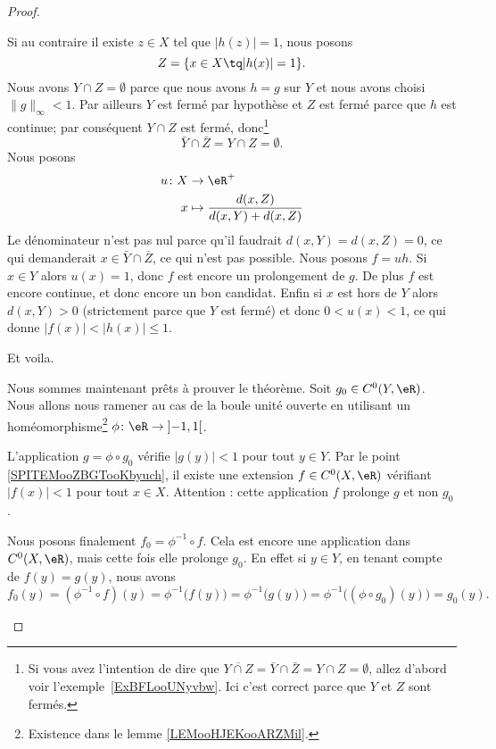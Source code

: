 \begin{proof}
\begin{subproof}
		Si au contraire il existe \( z\in X\) tel que \( | h(z)|=1 \), nous posons
		\begin{equation}		\label{EQooIVXAooZQZxlq}
			Z=\{ x\in X\tq | h(x) |=1 \}.
		\end{equation}
		Nous avons \( Y\cap Z=\emptyset\) parce que nous avons \( h=g\) sur \( Y\) et nous avons choisi \( \| g \|_{\infty}<1\). Par ailleurs \( Y\) est fermé par hypothèse et \( Z\) est fermé parce que \( h\) est continue; par conséquent \( Y\cap Z\) est fermé, donc\footnote{Si vous avez l'intention de dire que \( \overline{ Y\cap Z }=\bar Y\cap\bar Z=Y\cap Z=\emptyset\), allez d'abord voir l'exemple~\ref{ExBFLooUNyvbw}. Ici c'est correct parce que \( Y\) et \( Z\) sont fermés.}
		\begin{equation}
			\bar Y\cap\bar Z=Y\cap Z=\emptyset.
		\end{equation}
		Nous posons
		\begin{equation}
			\begin{aligned}
				u\colon X & \to \eR^+                                \\
				x         & \mapsto \frac{ d(x,Z) }{ d(x,Y)+d(x,Z) }
			\end{aligned}
		\end{equation}
		Le dénominateur n'est pas nul parce qu'il faudrait \( d(x,Y)=d(x,Z)=0\), ce qui demanderait \( x\in \bar Y\cap\bar Z\), ce qui n'est pas possible. Nous posons \( f=uh\). Si \( x\in Y\) alors \( u(x)=1\), donc \( f\) est encore un prolongement de \( g\). De plus \( f\) est encore continue, et donc encore un bon candidat. Enfin si \( x\) est hors de \( Y\) alors \( d(x,Y)>0\) (strictement parce que \( Y\) est fermé) et donc \( 0<u(x)<1\), ce qui donne \( | f(x) |<| h(x) |\leq 1\).

		Et voila.


		Nous sommes maintenant prêts à prouver le théorème. Soit \( g_0\in C^0(Y,\eR)\). Nous allons nous ramener au cas de la boule unité ouverte en utilisant un homéomorphisme\footnote{Existence dans le lemme \ref{LEMooHJEKooARZMil}.} \( \phi\colon \eR\to \mathopen] -1 , 1 \mathclose[\).

		L'application \( g=\phi\circ g_0\) vérifie \( | g(y) |<1\) pour tout \( y\in Y\). Par le point \ref{SPITEMooZBGTooKbyuch}, il existe une extension \( f\in C^0(X,\eR)\) vérifiant \( | f(x) |<1\) pour tout \( x\in X\). Attention : cette application \( f\) prolonge \( g\) et non \( g_0\).

		Nous posons finalement \( f_0=\phi^{-1}\circ f\). Cela est encore une application dans \( C^0(X,\eR)\), mais cette fois elle prolonge \( g_0\). En effet si \( y\in Y\), en tenant compte de \( f(y)=g(y)\), nous avons
		\begin{equation}
			f_0(y)=(\phi^{-1}\circ f)(y)=\phi^{-1}\big( f(y) \big)=\phi^{-1}\big( g(y) \big)=\phi^{-1}\big( (\phi\circ g_0)(y) \big)=g_0(y).
		\end{equation}
	\end{subproof}
\end{proof}

